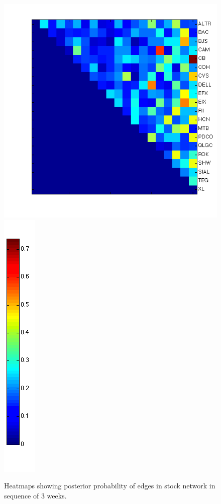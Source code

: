 \documentclass{article}
\begin{document}
\begin{figure}[h!tbp]
  \includegraphics[height=0.18\textheight]{fig/stocks3.png}
  \hspace{4mm}
  \includegraphics[height=0.18\textheight]{fig/colorbar.png}
  \caption{Heatmaps showing posterior probability of edges in stock network in sequence of 3 weeks.}
  \label{fig:stockResults}
\end{figure}
\end{document}
